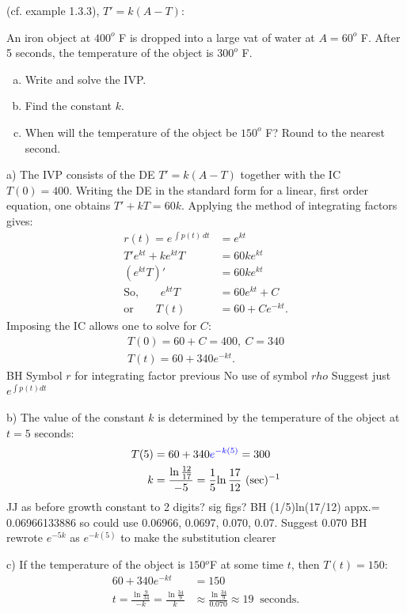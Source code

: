 \documentclass[12pt]{book}
\begin{document}
\vspace{5mm}
\setcounter{section}{4}
\setcounter{example}{1}
\begin{example}\label{Lineareqandif:Newtoncool}(cf. example 1.3.3), $T' = k(A-T)$:
\newline

An iron object at $400^o$ F is dropped into a large vat of water 
{\color{blue}
at $A=60^o$ F. 
}
After 5 seconds, the temperature of the object is $300^o$ F.
\begin{enumerate}[a)]
    \item Write and solve the IVP.
    \item Find the constant $k.$
    \item When will the temperature of the object be $150^o$ F? Round to the nearest second.
\end{enumerate}

a) The IVP consists of the DE $T' = k(A-T)$ 
together with the IC $T(0)=400$. 
Writing the DE in the standard form for a linear, first order equation, one obtains $T'+ kT = 60k$. 
Applying the method of integrating factors gives:
\begin{align*}
    r(t) = e^{\,\int\!p(t)\,dt} &= e^{kt}\\
    T' e^{kt} + k e^{kt} T &= 60ke^{kt}\\
    (e^{kt}T)' &= 60k e^{kt}\\
    \text{So,}\qquad e^{kt}T &= 60e^{kt} + C\\
    \text{or}\qquad T(t) &= 60 + Ce^{-kt}.
\end{align*}
Imposing the IC allows one to solve for $C$:
\begin{align*}
T(0) = 60 + C = 400,\ C = 340\\
T(t) = 60 + 340 e^{-kt}.
\end{align*}
{\color{teal}BH Symbol $r$ for integrating factor previous
No use of symbol $rho$ Suggest just $e^{\int p(t)dt}$}

b) The value of the constant $k$ is determined by the temperature of the object at 
$t=5$ seconds:
\begin{align*}
    T(5) &= 60 + 340 {\color{blue}e^{-k(5)}} = 300 \\
    k &= \frac{\ln\frac{12}{17}}{-5}
   = \frac{1}{5}{\ln\frac{17}{12}} \,\,(\text{sec})^{-1}
\end{align*}
{\color{teal}JJ as before growth constant to 2 digits?
sig figs? 
BH (1/5)ln(17/12) appx.= 0.06966133886
so could use 0.06966, 0.0697, 0.070, 0.07.
Suggest 0.070}
{\color{teal}BH rewrote $e^{-5k}$
as $e^{-k(5)}$ to make the substitution clearer}

c) If the temperature
of the object is $150 {}^{o}$F at some
time $t$, then $T(t)=150$:
\begin{align*}
   60 + 340e^{-kt} &= 150\\
   t = \frac{\ln \frac{9}{34}}{-k}
   = \frac{\ln \frac{34}{9}}{k}
    &\approx \frac{\ln \frac{34}{9}}{0.070}
   \approx 19\ \text{ seconds.}
\end{align*}
\end{example}
\vspace{5mm}
\end{document}

